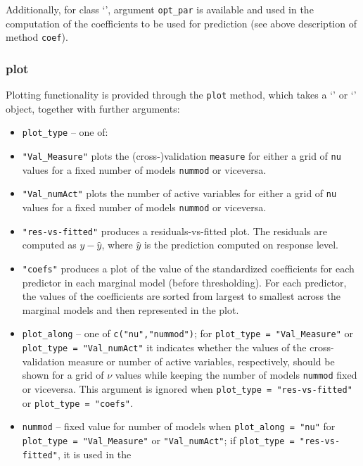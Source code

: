 \documentclass[
  article,
  nojss]{jss}
\newcommand{\class}[1]{`\code{#1}'}
\begin{document}
Additionally, for class \class{spar.cv}, argument \texttt{opt\_par} is
available and used in the computation of the coefficients to be used for
prediction (see above description of method \texttt{coef}).

\subsubsection{plot}\label{plot}

Plotting functionality is provided through the \texttt{plot} method,
which takes a \class{spar} or \class{spar.cv} object, together with
further arguments:

\begin{itemize}
\item
  \texttt{plot\_type} -- one of:
\item
  \texttt{"Val\_Measure"} plots the (cross-)validation \texttt{measure}
  for either a grid of \texttt{nu} values for a fixed number of models
  \texttt{nummod} or viceversa.
\item
  \texttt{"Val\_numAct"} plots the number of active variables for either
  a grid of \texttt{nu} values for a fixed number of models
  \texttt{nummod} or viceversa.
\item
  \texttt{"res-vs-fitted"} produces a residuals-vs-fitted plot. The
  residuals are computed as \(y- \widehat y\), where \(\widehat y\) is
  the prediction computed on response level.
\item
  \texttt{"coefs"} produces a plot of the value of the standardized
  coefficients for each predictor in each marginal model (before
  thresholding). For each predictor, the values of the coefficients are
  sorted from largest to smallest across the marginal models and then
  represented in the plot.
\item
  \texttt{plot\_along} -- one of \texttt{c("nu","nummod")}; for
  \texttt{plot\_type\ =\ "Val\_Measure"} or
  \texttt{plot\_type\ =\ "Val\_numAct"} it indicates whether the values
  of the cross-validation measure or number of active variables,
  respectively, should be shown for a grid of \(\nu\) values while
  keeping the number of models \texttt{nummod} fixed or viceversa. This
  argument is ignored when \texttt{plot\_type\ =\ "res-vs-fitted"} or
  \texttt{plot\_type\ =\ "coefs"}.
\item
  \texttt{nummod} -- fixed value for number of models when
  \texttt{plot\_along\ =\ "nu"} for
  \texttt{plot\_type\ =\ "Val\_Measure"} or \texttt{"Val\_numAct"}; if
  \texttt{plot\_type\ =\ "res-vs-fitted"}, it is used in the

\end{itemize}
\end{document}
